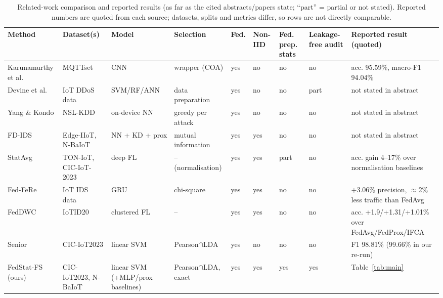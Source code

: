 \begin{table}[t]
\centering
\caption{Related-work comparison and reported results (as far as the cited abstracts/papers state; ``part'' = partial or not stated). Reported numbers are quoted from each source; datasets, splits and metrics differ, so rows are not directly comparable.}
\label{tab:related}\label{tab:lit}
\tiny
\setlength{\tabcolsep}{2.4pt}
\begin{tabular}{p{2.3cm}p{1.9cm}p{1.6cm}p{1.6cm}p{0.6cm}p{0.8cm}p{1.0cm}p{1.1cm}p{3.6cm}}
\toprule
Method & Dataset(s) & Model & Selection & Fed. & Non-IID & Fed. prep. stats & Leakage-free audit & Reported result (quoted) \\
\midrule
Karunamurthy et al. \cite{karunamurthy2025} & MQTTset & CNN & wrapper (COA) & yes & no & no & no & acc. 95.59\%, macro-F1 94.04\% \\
Devine et al. \cite{devine2025} & IoT DDoS data & SVM/RF/ANN & data preparation & yes & no & no & part & not stated in abstract \\
Yang \& Kondo \cite{yang2021} & NSL-KDD & on-device NN & greedy per attack & yes & no & no & no & not stated in abstract \\
FD-IDS \cite{fdids2025} & Edge-IIoT, N-BaIoT & NN + KD + prox & mutual information & yes & yes & no & no & not stated in abstract \\
StatAvg \cite{bouzinis2025} & TON-IoT, CIC-IoT-2023 & deep FL & -- (normalisation) & yes & yes & part & no & acc. gain 4--17\% over normalisation baselines \\
Fed-FeRe \cite{nguyen2026} & IoT IDS data & GRU & chi-square & yes & yes & no & no & +3.06\% precision, $\approx$2\% less traffic than FedAvg \\
FedDWC \cite{fedDWC2025} & IoTID20 & clustered FL & -- & yes & yes & no & no & acc. +1.9/+1.31/+1.01\% over FedAvg/FedProx/IFCA \\
Senior \cite{senior2026} & CIC-IoT2023 & linear SVM & Pearson$\cap$LDA & yes & no & no & no & F1 98.81\% (99.66\% in our re-run) \\
FedStat-FS (ours) & CIC-IoT2023, N-BaIoT & linear SVM (+MLP/prox baselines) & Pearson$\cap$LDA, exact & yes & yes & yes & yes & Table~\ref{tab:main} \\
\bottomrule
\end{tabular}
\end{table}